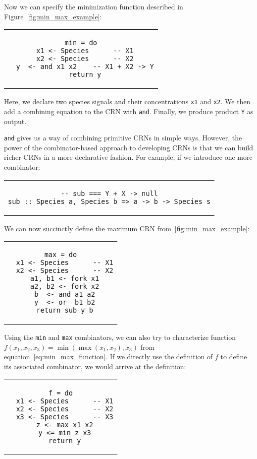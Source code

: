 Now we can specify the minimization function described in Figure~\ref{fig:min_max_example}:
\begin{center}\begin{tabular}{c}\begin{lstlisting}
min = do
  x1 <- Species      -- X1
  x2 <- Species      -- X2
  y  <- and x1 x2    -- X1 + X2 -> Y
  return y
\end{lstlisting}\end{tabular}\end{center}
Here, we declare two species signals and their concentrations \lstinline!x1! and \lstinline!x2!.
We then add a combining equation to the CRN with \lstinline!and!.
Finally, we produce product \lstinline!Y! as output.

\lstinline!and! gives us a way of combining primitive CRNs in simple ways.
However, the power of the combinator-based approach to developing CRNs is that we can build richer CRNs in a more declarative fashion.
For example, if we introduce one more combinator:
\begin{center}\begin{tabular}{c}\begin{lstlisting}
-- sub === Y + X -> null
sub :: Species a, Species b => a -> b -> Species s
\end{lstlisting}\end{tabular}\end{center}
We can now succinctly define the maximum CRN from~\autoref{fig:min_max_example}:
\begin{center}\begin{tabular}{c}\begin{lstlisting}
max = do
  x1 <- Species      -- X1
  x2 <- Species      -- X2
  a1, b1 <- fork x1
  a2, b2 <- fork x2
  b  <- and a1 a2
  y  <- or  b1 b2
  return sub y b
\end{lstlisting}\end{tabular}\end{center}

Using the \lstinline!min! and \lstinline!max! combinators, we can also try to characterize function \( f(x_1, x_2, x_3) = \min(\max(x_1, x_2), x_3) \) from equation~\eqref{eq:min_max_function}.
If we directly use the definition of \( f \) to define its associated combinator, we would arrive at the definition:

\begin{center}\begin{tabular}{c}\begin{lstlisting}
f = do
  x1 <- Species      -- X1
  x2 <- Species      -- X2
  x3 <- Species      -- X3
  z <- max x1 x2
  y <= min z x3
  return y
\end{lstlisting}\end{tabular}\end{center}

